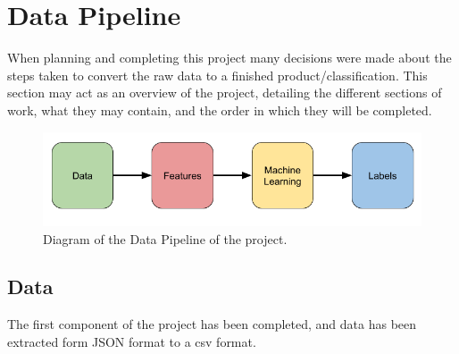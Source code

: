 \documentclass{article}
\begin{document}



\section{Data Pipeline}

When planning and completing this project many decisions were made about the steps taken to convert the raw data to a finished product/classification.
This section may act as an overview of the project, detailing the different sections of work, what they may contain, and the order in which they will be completed.

\begin{figure}[ht]
    \centering
    \includegraphics[scale=0.5]{Images/Data-Pipeline.png}
    \caption{Diagram of the Data Pipeline of the project.}
    \label{fig:test}
\end{figure}


\subsection{Data}



The first component of the project has been completed, and data has been extracted form JSON format to a csv format.
\end{document}
